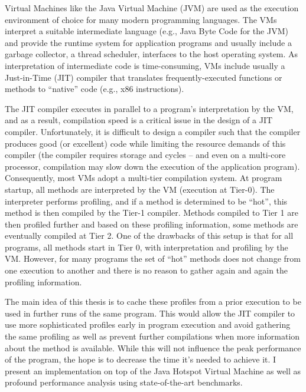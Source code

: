 Virtual Machines like the Java Virtual Machine (JVM) are used as the execution environment of choice for many modern programming languages. 
The VMs interpret a suitable intermediate language (e.g., Java Byte Code for the JVM) and provide the runtime system for application programs and usually include a garbage collector, a thread scheduler, interfaces to the host operating system. 
As interpretation of intermediate code is time-consuming, VMs include usually a Just-in-Time (JIT) compiler that translates frequently-executed functions or methods to “native” code (e.g., x86 instructions).

The JIT compiler executes in parallel to a program’s interpretation by the VM, and as a result, compilation speed is a critical issue in the design of a JIT compiler.
Unfortunately, it is difficult to design a compiler such that the compiler produces good (or excellent) code while limiting the resource demands of this compiler (the compiler requires storage and cycles – and even on a multi-core processor, compilation may slow down the execution of the application program). 
Consequently, most VMs adopt a multi-tier compilation system.
At program startup, all methods are interpreted by the VM (execution at Tier-0). The interpreter performs profiling, and if a method is determined to be “hot”, this method is then compiled by the Tier-1 compiler. Methods compiled to Tier 1 are then profiled further and based on these profiling information, some methods are eventually compiled at Tier 2.
One of the drawbacks of this setup is that for all programs, all methods start in Tier 0, with interpretation and profiling by the VM. However, for many programs the set of “hot” methods does not change from one execution to another and there is no reason to gather again and again the profiling information. 

The main idea of this thesis is to cache these profiles from a prior execution to be used in further runs of the same program. 
This would allow the JIT compiler to use more sophisticated profiles early in program execution and avoid gathering the same profiling as well as prevent further compilations when more information about the method is available. While this will not influence the peak performance of the program, the hope is to decrease the time it's needed to achieve it.
I present an implementation on top of the Java Hotspot Virtual Machine as well as profound performance analysis using state-of-the-art benchmarks.
